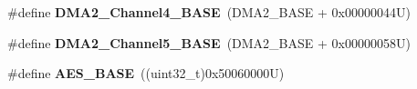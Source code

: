 \begin{DoxyCompactItemize}
\item 
\hypertarget{group___peripheral__memory__map_ga01b063266473f290a55047654fbbfbee}{\#define {\bfseries D\-M\-A2\-\_\-\-Channel4\-\_\-\-B\-A\-S\-E}~(D\-M\-A2\-\_\-\-B\-A\-S\-E + 0x00000044\-U)}\label{group___peripheral__memory__map_ga01b063266473f290a55047654fbbfbee}

\item 
\hypertarget{group___peripheral__memory__map_ga1eea983a5d68bf36f4d19fbb07955ca1}{\#define {\bfseries D\-M\-A2\-\_\-\-Channel5\-\_\-\-B\-A\-S\-E}~(D\-M\-A2\-\_\-\-B\-A\-S\-E + 0x00000058\-U)}\label{group___peripheral__memory__map_ga1eea983a5d68bf36f4d19fbb07955ca1}

\item 
\hypertarget{group___peripheral__memory__map_gad099ae8679538f6c00294639d67528bf}{\#define {\bfseries A\-E\-S\-\_\-\-B\-A\-S\-E}~((uint32\-\_\-t)0x50060000\-U)}\label{group___peripheral__memory__map_gad099ae8679538f6c00294639d67528bf}


\end{DoxyCompactItemize}

